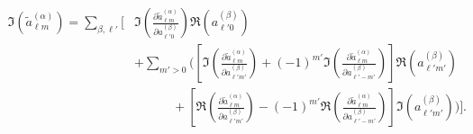 \begin{equation}
\begin{split}
\Im \left( \widetilde{a}_{\ell m}^{ \left( \alpha \right) } \right) =
\sum_{\beta, \ell'} \Bigg[ &
\Im \left(
\frac{\partial \widetilde{a}_{\ell m}^{ \left( \alpha \right) }}
{\partial a_{\ell' 0}^{ \left( \beta \right) }}
\right)
\Re \left( a_{\ell' 0}^{ \left( \beta \right) } \right) \\
& +
\sum_{m' > 0} \Bigg( \left[
\Im \left(
\frac{\partial \widetilde{a}_{\ell m}^{ \left( \alpha \right) }}
{\partial a_{\ell' m'}^{ \left( \beta \right) }}
\right)
+ \left( -1 \right)^{m'}
\Im \left(
\frac{\partial \widetilde{a}_{\ell m}^{ \left( \alpha \right) }}
{\partial a_{\ell' -m'}^{ \left( \beta \right) }}
\right) \right]
\Re \left(
a_{\ell' m'}^{ \left( \beta \right) }
\right) \\
& \qquad\quad +
\left[ \Re \left(
\frac{\partial \widetilde{a}_{\ell m}^{ \left( \alpha \right) }}
{\partial a_{\ell' m'}^{ \left( \beta \right) }}
\right)
- \left( -1 \right)^{m'}
\Re \left(
\frac{\partial \widetilde{a}_{\ell m}^{ \left( \alpha \right) }}
{\partial a_{\ell' -m'}^{ \left( \beta \right) }}
\right) \right]
\Im \left(
a_{\ell' m'}^{ \left( \beta \right) }
\right) \Bigg) \Bigg].
\label{el_Eqn:Im_alm_general}
\end{split}
\end{equation}

